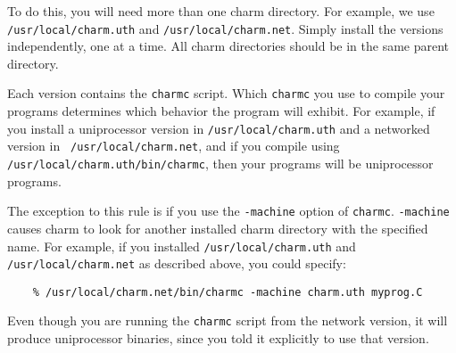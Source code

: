 To do this, you will need more than one charm directory.  For example,
we use {\tt /usr/local/charm.uth} and {\tt /usr/local/charm.net}.
Simply install the versions independently, one at a time.  All charm
directories should be in the same parent directory.

Each version contains the {\tt charmc} script.  Which {\tt charmc} you
use to compile your programs determines which behavior the program
will exhibit.  For example, if you install a uniprocessor version in
{\tt /usr/local/charm.uth} and a networked version in {\tt
/usr/local/charm.net}, and if you compile using {\tt
/usr/local/charm.uth/bin/charmc}, then your programs will be
uniprocessor programs.

The exception to this rule is if you use the {\tt -machine} option of
{\tt charmc}.  {\tt -machine} causes charm to look for another
installed charm directory with the specified name.  For example, if
you installed {\tt /usr/local/charm.uth} and {\tt
/usr/local/charm.net} as described above, you could specify:

\begin{verbatim}
    % /usr/local/charm.net/bin/charmc -machine charm.uth myprog.C
\end{verbatim}

Even though you are running the {\tt charmc} script from the network
version, it will produce uniprocessor binaries, since you told it
explicitly to use that version.



